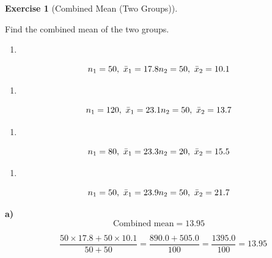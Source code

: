 \documentclass[
  letterpaper,
  DIV=11,
  numbers=noendperiod]{scrreprt}
\providecommand{\tightlist}{%
  \setlength{\itemsep}{0pt}\setlength{\parskip}{0pt}}
\theoremstyle{definition}
\newtheorem{exercise}{Exercise}[chapter]
\theoremstyle{remark}
\begin{document}
\begin{exercise}[Combined Mean (Two
Groups)]\protect\hypertarget{exr-grp-5}{}\label{exr-grp-5}

Find the combined mean of the two groups.

\begin{enumerate}
\def\labelenumi{\alph{enumi})}
\tightlist
\item
\end{enumerate}

\[n_1=50,\ \bar{x}_1=17.8\\[4pt]n_2=50,\ \bar{x}_2=10.1\]

\begin{enumerate}
\def\labelenumi{\alph{enumi})}
\setcounter{enumi}{1}
\tightlist
\item
\end{enumerate}

\[n_1=120,\ \bar{x}_1=23.1\\[4pt]n_2=50,\ \bar{x}_2=13.7\]

\begin{enumerate}
\def\labelenumi{\alph{enumi})}
\setcounter{enumi}{2}
\tightlist
\item
\end{enumerate}

\[n_1=80,\ \bar{x}_1=23.3\\[4pt]n_2=20,\ \bar{x}_2=15.5\]

\begin{enumerate}
\def\labelenumi{\alph{enumi})}
\setcounter{enumi}{3}
\tightlist
\item
\end{enumerate}

\[n_1=50,\ \bar{x}_1=23.9\\[4pt]n_2=50,\ \bar{x}_2=21.7\]

\begin{tcolorbox}[enhanced jigsaw, opacitybacktitle=0.6, coltitle=black, arc=.35mm, colframe=quarto-callout-tip-color-frame, colback=white, bottomrule=.15mm, left=2mm, colbacktitle=quarto-callout-tip-color!10!white, titlerule=0mm, opacityback=0, title=\textcolor{quarto-callout-tip-color}{\faLightbulb}\hspace{0.5em}{🔍 View Solution}, leftrule=.75mm, breakable, rightrule=.15mm, bottomtitle=1mm, toptitle=1mm, toprule=.15mm]

\textbf{a)} \[\text{Combined mean} = 13.95\]

\[\quad \frac{50\times17.8+50\times10.1}{50+50}=\frac{890.0+505.0}{100}=\frac{1395.0}{100}=13.95\]


\end{tcolorbox}
\end{exercise}
\end{document}
